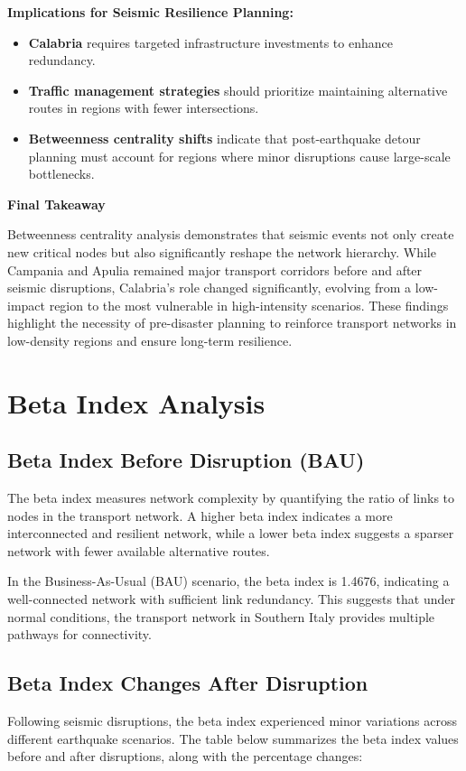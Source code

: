 \textbf{Implications for Seismic Resilience Planning:}
\begin{itemize}
    \item \textbf{Calabria} requires targeted infrastructure investments to enhance redundancy.
    \item \textbf{Traffic management strategies} should prioritize maintaining alternative routes in regions with fewer intersections.
    \item \textbf{Betweenness centrality shifts} indicate that post-earthquake detour planning must account for regions where minor disruptions cause large-scale bottlenecks.
\end{itemize}

\textbf{Final Takeaway}

Betweenness centrality analysis demonstrates that seismic events not only create new critical nodes but also significantly reshape the network hierarchy. While Campania and Apulia remained major transport corridors before and after seismic disruptions, Calabria's role changed significantly, evolving from a low-impact region to the most vulnerable in high-intensity scenarios. These findings highlight the necessity of pre-disaster planning to reinforce transport networks in low-density regions and ensure long-term resilience.

\section{Beta Index Analysis}
\subsection{Beta Index Before Disruption (BAU)}
The beta index measures network complexity by quantifying the ratio of links to nodes in the transport network. A higher beta index indicates a more interconnected and resilient network, while a lower beta index suggests a sparser network with fewer available alternative routes.

In the Business-As-Usual (BAU) scenario, the beta index is 1.4676, indicating a well-connected network with sufficient link redundancy. This suggests that under normal conditions, the transport network in Southern Italy provides multiple pathways for connectivity.

\subsection{Beta Index Changes After Disruption}
Following seismic disruptions, the beta index experienced minor variations across different earthquake scenarios. The table below summarizes the beta index values before and after disruptions, along with the percentage changes:

